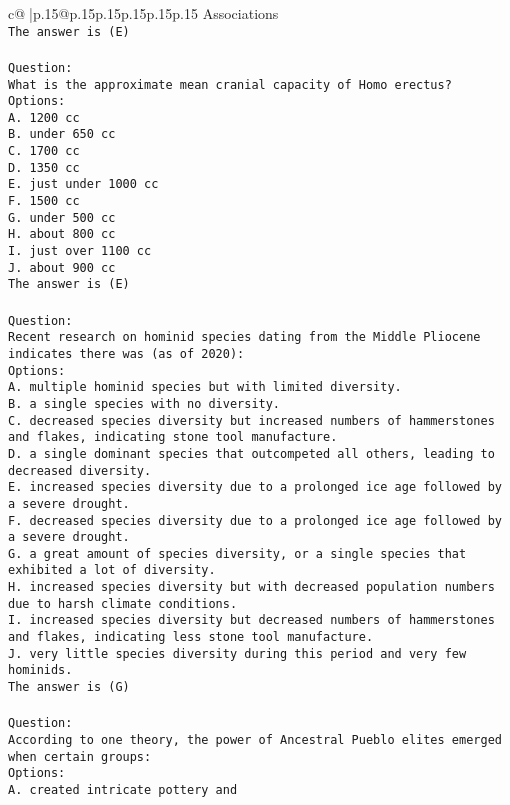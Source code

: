 \documentclass{article}
\begin{document}
{\begin{supertabular}{c@{$\;$}|p{.15\linewidth}@{}p{.15\linewidth}p{.15\linewidth}p{.15\linewidth}p{.15\linewidth}p{.15\linewidth}}
{{{Associations\\ \tt The answer is (E)\\ \tt \\ \tt Question:\\ \tt What is the approximate mean cranial capacity of Homo erectus?\\ \tt Options:\\ \tt A. 1200 cc\\ \tt B. under 650 cc\\ \tt C. 1700 cc\\ \tt D. 1350 cc\\ \tt E. just under 1000 cc\\ \tt F. 1500 cc\\ \tt G. under 500 cc\\ \tt H. about 800 cc\\ \tt I. just over 1100 cc\\ \tt J. about 900 cc\\ \tt The answer is (E)\\ \tt \\ \tt Question:\\ \tt Recent research on hominid species dating from the Middle Pliocene indicates there was (as of 2020):\\ \tt Options:\\ \tt A. multiple hominid species but with limited diversity.\\ \tt B. a single species with no diversity.\\ \tt C. decreased species diversity but increased numbers of hammerstones and flakes, indicating stone tool manufacture.\\ \tt D. a single dominant species that outcompeted all others, leading to decreased diversity.\\ \tt E. increased species diversity due to a prolonged ice age followed by a severe drought.\\ \tt F. decreased species diversity due to a prolonged ice age followed by a severe drought.\\ \tt G. a great amount of species diversity, or a single species that exhibited a lot of diversity.\\ \tt H. increased species diversity but with decreased population numbers due to harsh climate conditions.\\ \tt I. increased species diversity but decreased numbers of hammerstones and flakes, indicating less stone tool manufacture.\\ \tt J. very little species diversity during this period and very few hominids.\\ \tt The answer is (G)\\ \tt \\ \tt Question:\\ \tt According to one theory, the power of Ancestral Pueblo elites emerged when certain groups:\\ \tt Options:\\ \tt A. created intricate pottery and }}}
\end{supertabular}}
\end{document}
